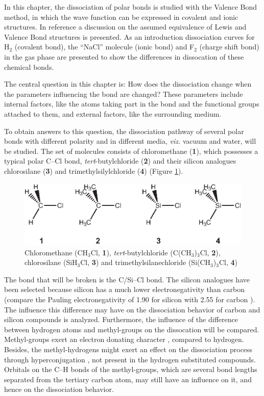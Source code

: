 In this chapter, the dissociation of polar bonds is studied with the Valence Bond method, in which the wave function can be expressed in covalent and ionic structures. In reference \cite{interpret} a discussion on the assumed equivalence of Lewis and Valence Bond structures is presented. As an introduction dissociation curves for H$_2$ (covalent bond), the ``NaCl'' molecule (ionic bond) and F$_2$ (charge shift bond) in the gas phase are presented to show the differences in dissocation of these chemical bonds.

The central question in this chapter is: How does the dissociation change when the parameters influencing the bond are changed? These parameters include internal factors, like the atoms taking part in the bond and the functional groups attached to them, and external factors, like the surrounding medium. 

To obtain answers to this question, the dissociation pathway of several polar bonds with different polarity and in different media, \textit{viz.} vacuum and water, will be studied.  The set of molecules consists of chloromethane (\textbf{1}), which possesses a typical polar C--Cl bond, \textit{tert}-butylchloride (\textbf{2}) and their silicon analogues chlorosilane (\textbf{3}) and trimethylsilylchloride (\textbf{4}) (Figure \ref{ch3.fig.compounds}).  
\begin{figure}[htbp]
\begin{center}
\includegraphics{dissociation/figures/compounds.eps}
\end{center}
\caption{Chloromethane (CH$_3$Cl, \textbf{1}), \textit{tert}-butylchloride
(C(CH$_3$)$_3$Cl, \textbf{2}), chlorosilane (SiH$_3$Cl, \textbf{3}) and trimethylsilanechloride
(Si(CH$_3$)$_3$Cl, \textbf{4})}
\label{ch3.fig.compounds}
\end{figure} 
The bond that will be broken is the C/Si--Cl bond. The silicon analogues have been selected because silicon has a much lower electronegativity than carbon (compare the Pauling electronegativity of 1.90 for silicon with 2.55 for carbon \cite{handbook}). The influence this difference may have on the dissociation behavior of carbon and silicon compounds is analyzed. Furthermore, the influence of the difference between hydrogen atoms and methyl-groups on the dissocation will be compared. Methyl-groups exert an electron donating character \cite{mcmurry}, compared to hydrogen. Besides, the methyl-hydrogens might exert an effect on the dissociation process through hyperconjugation \cite{march}, not present in the hydrogen substituted compounds. Orbitals on the C--H bonds of the methyl-groups, which are several bond lengths separated from the tertiary carbon atom, may still have an influence on it, and hence on the dissociation behavior. 

